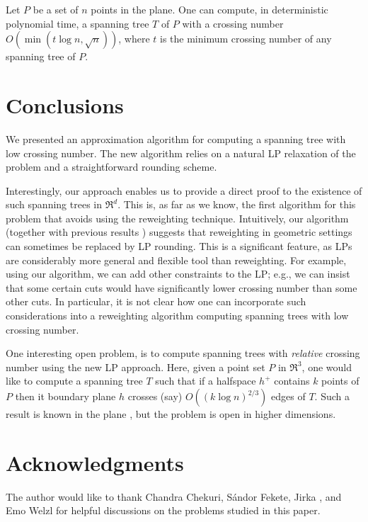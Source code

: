 \documentclass[12pt]{article}
\newcommand{\PntSet}{P}
\newcommand{\Term}[1]{\textsf{#1}}
\newcommand{\LP}{\Term{L{}P}\xspace}
\begin{document}
\begin{theorem}
    Let $\PntSet$ be a set of $n$ points in the plane.  One can
    compute, in deterministic polynomial time, a spanning tree $T$ of
    $\PntSet$ with a crossing number $O(\min( t \log n, \sqrt{n}) )$,
    where $t$ is the minimum crossing number of any spanning tree of
    $\PntSet$.

\end{theorem}

\section{Conclusions}

We presented an approximation algorithm for computing a spanning tree
with low crossing number. The new algorithm relies on a natural \LP
relaxation of the problem and a straightforward rounding scheme.

Interestingly, our approach enables us to provide a direct proof to
the existence of such spanning trees in $\Re^d$. This is, as far as we
know, the first algorithm for this problem that avoids using the
reweighting technique.  Intuitively, our algorithm (together with
previous results \cite{l-upsda-01}) suggests that reweighting in
geometric settings can sometimes be replaced by \LP rounding. This is
a significant feature, as \LP{}s are considerably more general and
flexible tool than reweighting. For example, using our algorithm, we
can add other constraints to the \LP; e.g., we can insist that some
certain cuts would have significantly lower crossing number than some
other cuts. In particular, it is not clear how one can incorporate
such considerations into a reweighting algorithm computing spanning
trees with low crossing number.

One interesting open problem, is to compute spanning trees with
\emph{relative} crossing number using the new \LP approach. Here,
given a point set $\PntSet$ in $\Re^3$, one would like to compute a
spanning tree $T$ such that if a halfspace $h^+$ contains $k$ points
of $\PntSet$ then it boundary plane $h$ crosses (say) $O( (k \log
n)^{2/3})$ edges of $T$. Such a result is known in the plane
\cite{ahs-ahrcr-07}, but the problem is open in higher dimensions.




\section*{Acknowledgments}

The author would like to thank Chandra Chekuri, S{\'a}\si{ndor}
Fekete, Jirka \Matousek, and Emo Welzl for helpful discussions on the
problems studied in this paper.



 

\end{document}
